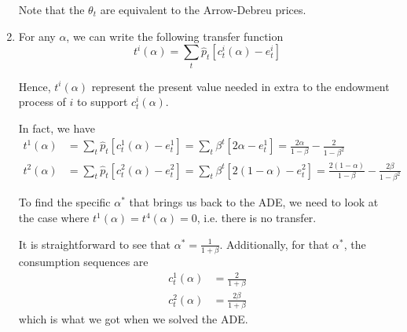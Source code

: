\documentclass[12pt]{article}
\newcommand{\1}{{\bf 1}} %
\newcommand{\bra}[1]{\left[#1\right]}
\begin{document}
\begin{enumerate}[(1)]
	Note that the $\theta_t$ are equivalent to the Arrow-Debreu prices.
	
	\item
	For any $\alpha$, we can write the following transfer function
	\[
	t^i(\alpha)=\sum_t \hat{p}_t\bra{c_t^i(\alpha)-e_t^i}
	\]
	
	Hence, $t^i(\alpha)$ represent the present value needed in extra to the endowment process of $i$ to support $c_t^i(\alpha)$.
	
	In fact, we have
	\[
	\begin{split}
	t^1(\alpha)&=\sum_t \hat{p}_t\bra{c_t^1(\alpha)-e_t^1}= \sum_t \beta^t\bra{2\alpha-e_t^1}= \frac{2\alpha}{1-\beta}-\frac{2}{1-\beta^2}\\
	t^2(\alpha)&=\sum_t \hat{p}_t\bra{c_t^2(\alpha)-e_t^2}=\sum_t \beta^t\bra{2(1-\alpha)-e_t^2}=\frac{2(1-\alpha)}{1-\beta}-\frac{2\beta}{1-\beta^2}
	\end{split}
	\]
	
	To find the specific $\alpha^*$ that brings us back to the ADE, we need to look at the case where $t^1(\alpha)=t^4(\alpha)=0$, i.e. there is no transfer. 
	
	It is straightforward to see that $\alpha^*=\frac{1}{1+\beta}$. Additionally, for that $\alpha^*$, the consumption sequences are
	\[
	\begin{split}
	c_t^1(\alpha)&=\frac{2}{1+\beta}\\
	c_t^2(\alpha)&=\frac{2\beta}{1+\beta}
	\end{split}
	\]	
	which is what we got when we solved the ADE.	
	

\end{enumerate}
\end{document}
